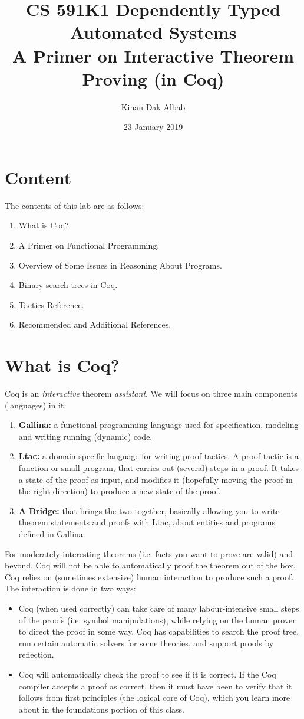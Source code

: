 \documentclass{article}
\title{CS 591K1 Dependently Typed Automated Systems\\
A Primer on Interactive Theorem Proving (in Coq)}
\author{Kinan Dak Albab}
\date{23 January 2019}
\begin{document}
\maketitle

\section {Content}
The contents of this lab are as follows:
\begin{enumerate}
    \item What is Coq?
    \item A Primer on Functional Programming.
    \item Overview of Some Issues in Reasoning About Programs.
    \item Binary search trees in Coq.
    \item Tactics Reference.
    \item Recommended and Additional References.
\end{enumerate}

\section{What is Coq?}
Coq is an \textit{interactive} theorem \textit{assistant}. We will focus on three main components (languages) in it:
\begin{enumerate}
    \item \textbf{Gallina:} a functional programming language used for specification, modeling and writing running (dynamic) code.
    \item \textbf{Ltac:} a domain-specific language for writing proof tactics. A proof tactic is a function or small program, that carries out (several) steps in a proof. It takes a state of the proof as input, and modifies it (hopefully moving the proof in the right direction) to produce a new state of the proof.
    \item \textbf{A Bridge:} that brings the two together, basically allowing you to write theorem statements and proofs with Ltac, about entities and programs defined in Gallina.
\end{enumerate}

For moderately interesting theorems (i.e. facts you want to prove are valid) and beyond, Coq will not be able to automatically proof the theorem out of the box. Coq relies on (sometimes extensive) human interaction to produce such a proof. The interaction is done in two ways:
\begin{itemize}
\item Coq (when used correctly) can take care of many labour-intensive small steps of the proofs (i.e. symbol manipulations), while relying on the human prover to direct the proof in some way. Coq has capabilities to search the proof tree, run certain automatic solvers for some theories, and support proofs by reflection. 
\item Coq will automatically check the proof to see if it is correct. If the Coq compiler accepts a proof as correct, then it must have been to verify that it follows from first principles (the logical core of Coq), which you learn more about in the foundations portion of this class.
\end{itemize}
\end{document}
